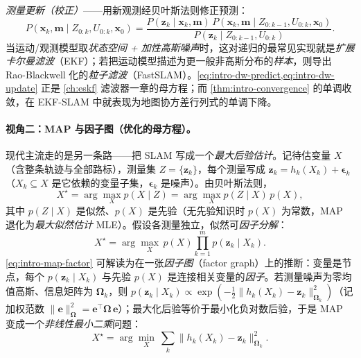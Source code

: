 \emph{测量更新（校正）}——用新观测经贝叶斯法则修正预测：
\begin{equation}
  P\!\left(\mathbf{x}_k,\mathbf{m}\mid Z_{0:k},U_{0:k},\mathbf{x}_0\right)
  =\frac{P\!\left(\mathbf{z}_k\mid \mathbf{x}_k,\mathbf{m}\right)\,
         P\!\left(\mathbf{x}_k,\mathbf{m}\mid Z_{0:k-1},U_{0:k},\mathbf{x}_0\right)}
        {P\!\left(\mathbf{z}_k\mid Z_{0:k-1},U_{0:k}\right)}.
  \label{eq:intro-dw-update}
\end{equation}
当运动/观测模型取\emph{状态空间 + 加性高斯噪声}时，这对递归的最常见实现就是\emph{扩展卡尔曼滤波}（EKF）；若把运动模型描述为更一般非高斯分布的\emph{样本}，则导出 Rao-Blackwell 化的\emph{粒子滤波}（FastSLAM）\cite{durrantwhyte2006slam}。\cref{eq:intro-dw-predict,eq:intro-dw-update} 正是 \cref{ch:eskf} 滤波器一章的母方程；而 \cref{thm:intro-convergence} 的单调收敛，在 EKF-SLAM 中就表现为地图协方差行列式的单调下降。

\paragraph{视角二：MAP 与因子图（优化的母方程）。}
现代主流走的是另一条路——把 SLAM 写成一个\emph{最大后验估计}\cite{cadena2016past}。记待估变量 $X$（含整条轨迹与全部路标），测量集 $Z=\{\mathbf{z}_k\}$，每个测量写成 $\mathbf{z}_k=h_k(X_k)+\boldsymbol{\epsilon}_k$（$X_k\subseteq X$ 是它依赖的变量子集，$\boldsymbol{\epsilon}_k$ 是噪声）。由贝叶斯法则，
\begin{equation}
  X^\star=\arg\max_X p(X\mid Z)=\arg\max_X p(Z\mid X)\,p(X),
  \label{eq:intro-map}
\end{equation}
其中 $p(Z\mid X)$ 是似然、$p(X)$ 是先验（无先验知识时 $p(X)$ 为常数，MAP 退化为\emph{最大似然估计} MLE）。假设各测量独立，似然可\emph{因子分解}：
\begin{equation}
  X^\star=\arg\max_X\, p(X)\prod_{k=1}^{m} p(\mathbf{z}_k\mid X_k).
  \label{eq:intro-map-factor}
\end{equation}
\cref{eq:intro-map-factor} 可解读为在一张\emph{因子图}（factor graph）上的推断：变量是节点，每个 $p(\mathbf{z}_k\mid X_k)$ 与先验 $p(X)$ 是连接相关变量的\emph{因子}。若测量噪声为零均值高斯、信息矩阵为 $\boldsymbol{\Omega}_k$，则 $p(\mathbf{z}_k\mid X_k)\propto\exp(-\tfrac12\|h_k(X_k)-\mathbf{z}_k\|_{\boldsymbol{\Omega}_k}^2)$（记加权范数 $\|\mathbf{e}\|_{\boldsymbol{\Omega}}^2=\mathbf{e}^\top\boldsymbol{\Omega}\,\mathbf{e}$）；最大化后验等价于最小化负对数后验，于是 MAP 变成一个\emph{非线性最小二乘}问题：
\begin{equation}
  X^\star=\arg\min_X\ \sum_{k} \big\|h_k(X_k)-\mathbf{z}_k\big\|_{\boldsymbol{\Omega}_k}^2.
  \label{eq:intro-nls}
\end{equation}


